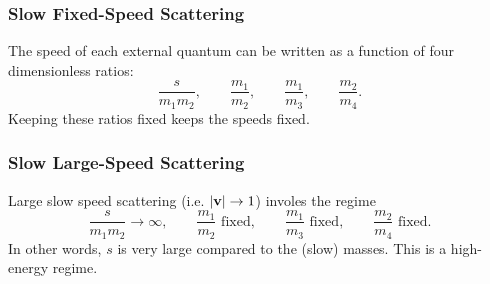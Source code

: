 \subsubsection{Slow Fixed-Speed Scattering}
The speed of each external quantum can be written as a function of four dimensionless ratios:
\begin{equation}
	\frac{s}{m_{1} m_{2}}, \qquad \frac{m_{1}}{m_{2}}, \qquad \frac{m_{1}}{m_{3}}, \qquad \frac{m_{2}}{m_{4}}.
\end{equation}
Keeping these ratios fixed keeps the speeds fixed.
\subsubsection{Slow Large-Speed Scattering}
Large slow speed scattering (i.e. $\left\lvert \mathbf{v} \right\rvert \rightarrow 1$) involes the regime
\begin{equation}
	\frac{s}{m_{1} m_{2}} \rightarrow \infty, \qquad \frac{m_{1}}{m_{2}} \text{ fixed}, \qquad \frac{m_{1}}{m_{3}} \text{ fixed}, \qquad \frac{m_{2}}{m_{4}} \text{ fixed}.
\end{equation}
In other words, $s$ is very large compared to the (slow) masses. This is a high-energy regime.
